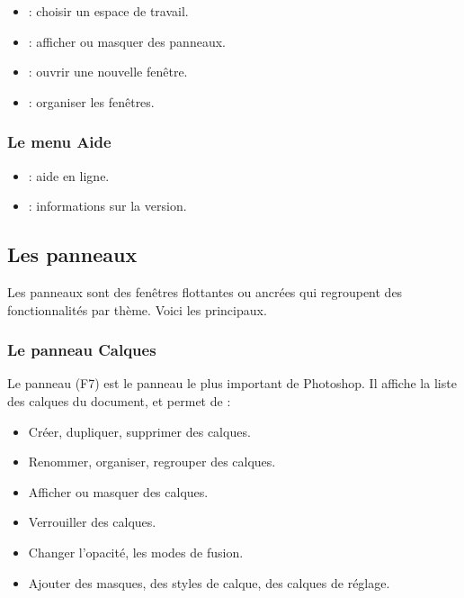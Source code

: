 \begin{itemize}
    \item {} : choisir un espace de travail.
    \item {} : afficher ou masquer des panneaux.
    \item {} : ouvrir une nouvelle fenêtre.
    \item {} : organiser les fenêtres.
\end{itemize}

\subsubsection{Le menu Aide}

\begin{itemize}
    \item {} : aide en ligne.
    \item {} : informations sur la version.
\end{itemize}

\subsection{Les panneaux}

Les panneaux sont des fenêtres flottantes ou ancrées qui regroupent des fonctionnalités par thème. Voici les principaux.

\subsubsection{Le panneau Calques}

Le panneau  (F7) est le panneau le plus important de Photoshop. Il affiche la liste des calques du document, et permet de :

\begin{itemize}
    \item Créer, dupliquer, supprimer des calques.
    \item Renommer, organiser, regrouper des calques.
    \item Afficher ou masquer des calques.
    \item Verrouiller des calques.
    \item Changer l'opacité, les modes de fusion.
    \item Ajouter des masques, des styles de calque, des calques de réglage.
\end{itemize}

